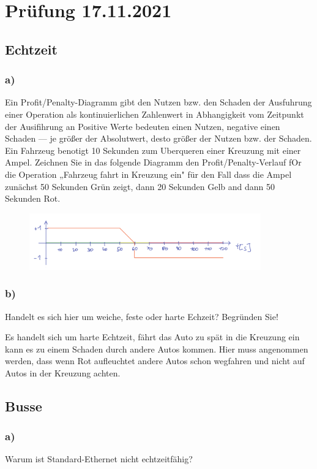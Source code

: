 \section{Prüfung 17.11.2021}
\subsection{Echtzeit}
\subsubsection{a)}
Ein Profit/Penalty-Diagramm gibt den Nutzen bzw. den Schaden der Ausfuhrung einer Operation als 
kontinuierlichen Zahlenwert in Abhangigkeit vom Zeitpunkt der Ausifihrung an Positive Werte 
bedeuten einen Nutzen, negative einen Schaden — je größer der Absolutwert, desto größer der Nutzen bzw. der Schaden. 
Ein Fahrzeug benotigt 10 Sekunden zum Uberqueren einer Kreuzung mit einer Ampel. 
Zeichnen Sie in das folgende Diagramm den Profit/Penalty-Verlauf fOr die Operation „Fahrzeug fahrt in Kreuzung ein" 
für den Fall dass die Ampel zunächst 50 Sekunden Grün zeigt, dann 20 Sekunden Gelb and dann 50 Sekunden Rot. 

\begin{figure}[H]
  \includegraphics[width=10cm]{images/KA171121/1a.png}
  \centering
\end{figure}

\subsubsection{b)}
Handelt es sich hier um weiche, feste oder harte Echzeit? Begründen Sie!

Es handelt sich um harte Echtzeit, fährt das Auto zu spät in die Kreuzung ein kann es zu einem Schaden durch 
andere Autos kommen. Hier muss angenommen werden, dass wenn Rot aufleuchtet andere Autos schon wegfahren und 
nicht auf Autos in der Kreuzung achten.

\subsection{Busse}
\subsubsection{a)}
Warum ist Standard-Ethernet nicht echtzeitfähig?

